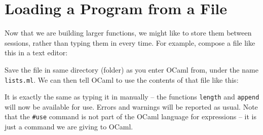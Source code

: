 \documentclass[]{book}
\newcommand{\smspace}{\vspace{4mm}}
\begin{document}
\pagestyle{empty}


\chapter*{Loading a Program from a File}

Now that we are building larger functions, we might like to store them between sessions, rather than typing them in every time. For example, compose a file like this in a text editor:

\smspace
\noindent{}
\smspace

\noindent Save the file in same directory (folder) as you enter OCaml from, under the name \texttt{lists.ml}. We can then tell OCaml to use the contents of that file like this:

\smspace
\noindent{}
\smspace

\noindent {}It is exactly the same as typing it in manually -- the functions \texttt{length} and \texttt{append} will now be available for use. Errors and warnings will be reported as usual. Note that the \texttt{\#use} command is not part of the OCaml language for expressions -- it is just a command we are giving to OCaml.
\end{document}
